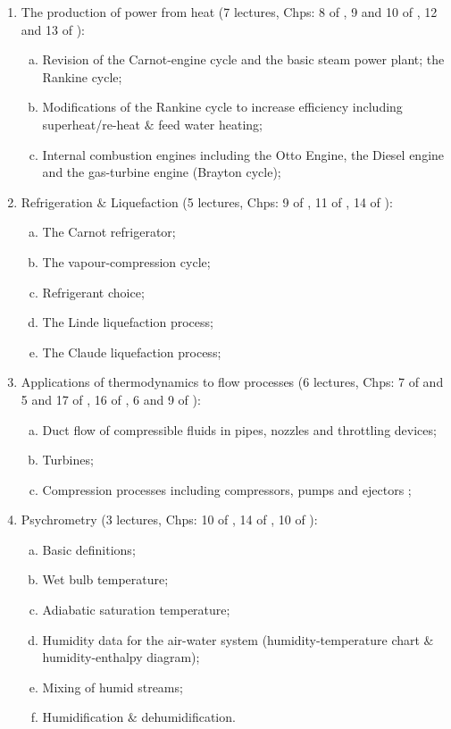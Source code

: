 \documentclass[11pt,oneside,a4paper]{article}
\begin{document}
\begin{enumerate}[{\bf Module 1:}]
\item The production of power from heat (7 lectures, Chps: 8 of \cite{smith_2001}, 9 and 10 of \cite{cengel_2010}, 12 and 13 of \cite{rajput_2007}): 
\begin{enumerate}[(a)]
\item Revision of the Carnot-engine cycle and the basic steam power plant; the Rankine cycle; 
\item Modifications of the Rankine cycle to increase efficiency including superheat/re-heat $\&$ feed water heating; 
\item Internal combustion engines including the Otto Engine, the Diesel engine and the gas-turbine engine (Brayton cycle); 
\end{enumerate}
%
\item Refrigeration $\&$ Liquefaction (5 lectures, Chps: 9 of \cite{smith_2001}, 11 of \cite{cengel_2010}, 14 of \cite{rajput_2007}):
\begin{enumerate}[(a)]
\item The Carnot refrigerator; 
\item The vapour-compression cycle; 
\item Refrigerant choice; 
\item The Linde liquefaction process; 
\item The Claude liquefaction process;
\end{enumerate}
%
\item Applications of thermodynamics to flow processes (6 lectures, Chps: 7 of \cite{smith_2001} and 5 and 17 of \cite{cengel_2010}, 16 of \cite{rajput_2007}, 6 and 9 of \cite{powers_2012}): 
\begin{enumerate}[(a)]
\item Duct flow of compressible fluids in pipes, nozzles and throttling devices; 
\item Turbines; 
\item Compression processes including compressors, pumps and ejectors ;
\end{enumerate}
%
\item Psychrometry (3 lectures, Chps: 10 of \cite{muller_2009}, 14 of \cite{cengel_2010}, 10 of \cite{rajput_2007}): 
\begin{enumerate}[(a)]
\item Basic definitions; 
\item Wet bulb temperature; 
\item Adiabatic saturation temperature; 
\item Humidity data for the air-water system (humidity-temperature chart $\&$ humidity-enthalpy diagram); 
\item Mixing of humid streams; 
\item Humidification $\&$ dehumidification.
\end{enumerate}

\end{enumerate}
\end{document}

